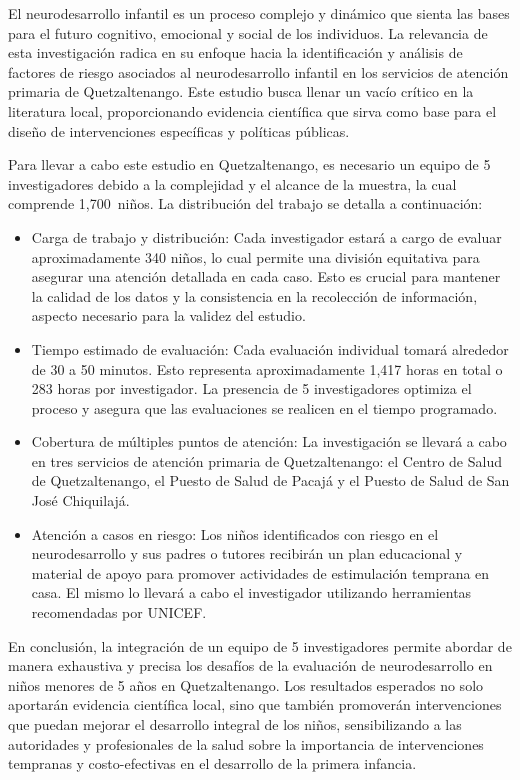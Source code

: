 \documentclass[11pt,letterpaper]{report}
\newcommand{\muestradeseada}{1,700}
\begin{document}
El neurodesarrollo infantil es un proceso complejo y dinámico que sienta las
bases para el futuro cognitivo, emocional y social de los individuos. La
relevancia de esta investigación radica en su enfoque hacia la identificación y
análisis de factores de riesgo asociados al neurodesarrollo infantil en los
servicios de atención primaria de Quetzaltenango. Este estudio busca llenar un
vacío crítico en la literatura local, proporcionando evidencia científica que
sirva como base para el diseño de intervenciones específicas y políticas
públicas.

Para llevar a cabo este estudio en Quetzaltenango, es necesario un equipo de 5
investigadores debido a la complejidad y el alcance de la muestra, la cual
comprende \muestradeseada\ niños. La distribución del trabajo se detalla a
continuación:

	\begin{itemize}
		\item Carga de trabajo y distribución: Cada investigador estará a cargo
		de evaluar aproximadamente 340 niños, lo cual permite una división
		equitativa para asegurar una atención detallada en cada caso. Esto es
		crucial para mantener la calidad de los datos y la consistencia en la
		recolección de información, aspecto necesario para la validez del
		estudio.
		\item Tiempo estimado de evaluación: Cada evaluación individual tomará
		alrededor de 30 a 50 minutos. Esto representa aproximadamente 1,417
		horas en total o 283 horas por investigador. La presencia de 5
		investigadores optimiza el proceso y asegura que las evaluaciones se
		realicen en el tiempo programado.
		\item Cobertura de múltiples puntos de atención: La investigación se
		llevará a cabo en tres servicios de atención primaria de
		Quetzaltenango: el Centro de Salud de Quetzaltenango, el Puesto de
		Salud de Pacajá y el Puesto de Salud de San José Chiquilajá.
		\item Atención a casos en riesgo: Los niños identificados con riesgo en
		el neurodesarrollo y sus padres o tutores recibirán un plan educacional
		y material de apoyo para promover actividades de estimulación temprana
		en casa. El mismo lo llevará a cabo el investigador utilizando
		herramientas recomendadas por UNICEF.
	\end{itemize}

En conclusión, la integración de un equipo de 5 investigadores permite abordar
de manera exhaustiva y precisa los desafíos de la evaluación de neurodesarrollo
en niños menores de 5 años en Quetzaltenango. Los resultados esperados no solo
aportarán evidencia científica local, sino que también promoverán
intervenciones que puedan mejorar el desarrollo integral de los niños,
sensibilizando a las autoridades y profesionales de la salud sobre la
importancia de intervenciones tempranas y costo-efectivas en el desarrollo de
la primera infancia.
\end{document}
